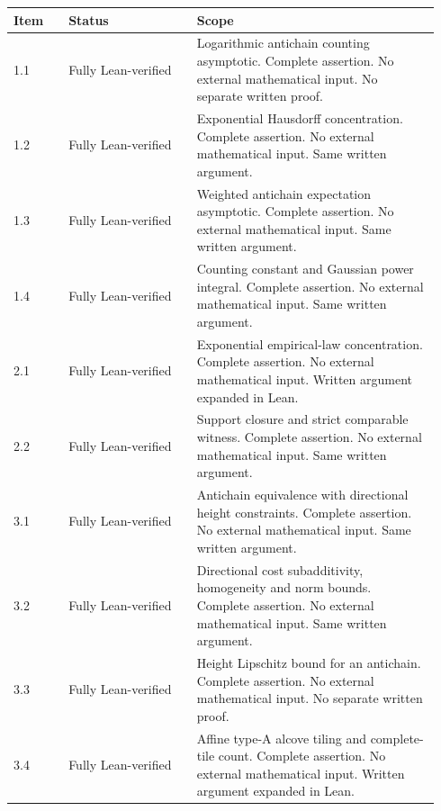 \small\begin{longtable}{@{}p{0.12\linewidth}p{0.29\linewidth}p{0.53\linewidth}@{}}

\textbf{Item} & \textbf{Status} & \textbf{Scope}\\\hline\endhead

1.1 & Fully Lean-verified & Logarithmic antichain counting asymptotic. Complete assertion. No external mathematical input. No separate written proof. \\

1.2 & Fully Lean-verified & Exponential Hausdorff concentration. Complete assertion. No external mathematical input. Same written argument. \\

1.3 & Fully Lean-verified & Weighted antichain expectation asymptotic. Complete assertion. No external mathematical input. Same written argument. \\

1.4 & Fully Lean-verified & Counting constant and Gaussian power integral. Complete assertion. No external mathematical input. Same written argument. \\

2.1 & Fully Lean-verified & Exponential empirical-law concentration. Complete assertion. No external mathematical input. Written argument expanded in Lean. \\

2.2 & Fully Lean-verified & Support closure and strict comparable witness. Complete assertion. No external mathematical input. Same written argument. \\

3.1 & Fully Lean-verified & Antichain equivalence with directional height constraints. Complete assertion. No external mathematical input. Same written argument. \\

3.2 & Fully Lean-verified & Directional cost subadditivity, homogeneity and norm bounds. Complete assertion. No external mathematical input. Same written argument. \\

3.3 & Fully Lean-verified & Height Lipschitz bound for an antichain. Complete assertion. No external mathematical input. No separate written proof. \\

3.4 & Fully Lean-verified & Affine type-A alcove tiling and complete-tile count. Complete assertion. No external mathematical input. Written argument expanded in Lean. \\


\end{longtable}
